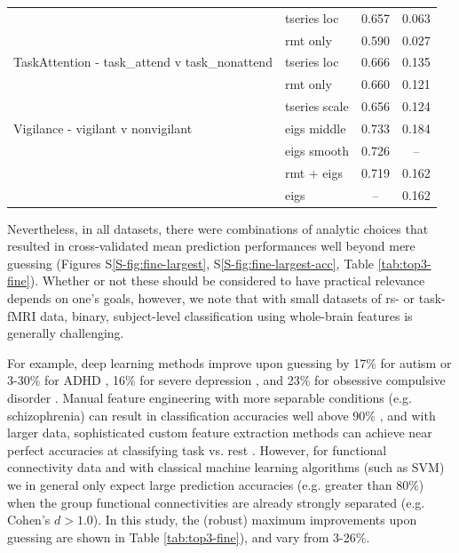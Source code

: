 \documentclass[12pt]{spieman}  %
\begin{document}
\begin{spacing}{2}
\begin{table}[h!]
\begin{tabular}{llcc}
                                   & tseries loc   &  0.657 &  0.063 \\
                                   & rmt only      &  0.590 &  0.027 \\
TaskAttention - task\_attend v task\_nonattend     & tseries loc &  0.666 &
0.135 \\
                                   & rmt only      &  0.660 &  0.121 \\
                                   & tseries scale &  0.656 &  0.124 \\
Vigilance - vigilant v nonvigilant & eigs middle   &  0.733 &  0.184 \\
                                   & eigs smooth   &  0.726 &    –   \\
                                   & rmt + eigs    &  0.719 &  0.162 \\
                                   & eigs          &    –   &  0.162 \\
\hline
\end{tabular}
\end{table}


Nevertheless, in all datasets, there were combinations of analytic choices that
resulted in cross-validated mean prediction performances well beyond mere guessing
(Figures S\ref{S-fig:fine-largest}, S\ref{S-fig:fine-largest-acc}, Table
\ref{tab:top3-fine}). Whether or not these should be considered to have
practical relevance depends on one's goals, however, we note that with small
datasets of rs- or task-fMRI data, binary, subject-level classification using
whole-brain features is generally challenging.

For example, deep learning methods improve upon guessing by 17\% for autism
\cite{bengs4DSpatioTemporalDeep2020} or 3-30\% for ADHD
\cite{riazDeepFMRIEndtoendDeep2020}, 16\% for severe depression
\cite{ramasubbuAccuracyAutomatedClassification2016}, and 23\% for obsessive
compulsive disorder \cite{takagiNeuralMarkerObsessiveCompulsive2017}. Manual
feature engineering with more separable conditions (e.g. schizophrenia) can
result in classification accuracies well above 90\%
\cite{duHighClassificationAccuracy2012}, and with larger data, sophisticated
custom feature extraction methods can achieve near perfect accuracies at
classifying task vs. rest
\cite{zhangCharacterizingDifferentiatingTaskbased2016}. However, for functional
connectivity data and with classical machine learning algorithms (such as SVM)
we in general only expect large prediction accuracies (e.g. greater than 80\%)
when the group functional connectivities are already strongly separated (e.g.
Cohen’s \(d > 1.0\))\cite{dansereauStatisticalPowerPrediction2017}. In this
study, the (robust) maximum improvements upon guessing are shown in Table
\ref{tab:top3-fine}), and vary from 3-26\%.


\end{spacing}
\end{document}

